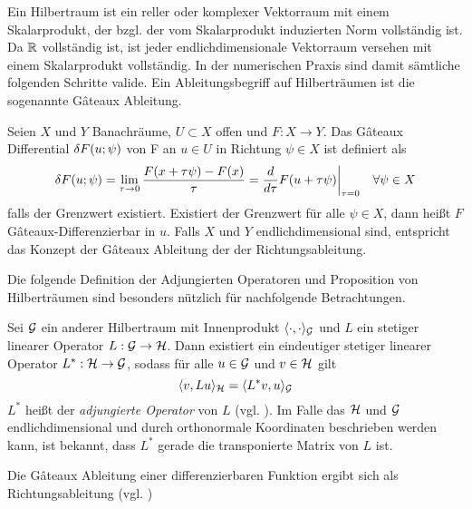 Ein Hilbertraum ist ein reller oder komplexer Vektorraum mit einem Skalarprodukt, der bzgl. der vom Skalarprodukt induzierten Norm vollständig ist. Da $\mathbb{R}$ vollständig ist, ist jeder endlichdimensionale Vektorraum versehen mit einem Skalarprodukt vollständig. In der numerischen Praxis sind damit sämtliche folgenden Schritte valide. 
Ein Ableitungsbegriff auf Hilberträumen ist die sogenannte Gâteaux Ableitung.
\begin{definition}
 Seien $X$ und $Y$ Banachräume, $U \subset X$ offen und $F:X\to Y$. Das Gâteaux Differential $\delta F(u;\psi)$ von F an $u\in U$ in Richtung $\psi\in X$ ist definiert als
 \[
  \delta F(u;\psi) = \lim_{\tau \to 0} \frac{F(x+\tau \psi) - F(x)}{\tau} = \frac{d}{d\tau} F(u+\tau\psi)\biggr\rvert_{\tau = 0}\quad \forall \psi \in X
 \]
 falls der Grenzwert existiert. Existiert der Grenzwert für alle $\psi\in X$, dann heißt $F$ Gâteaux-Differenzierbar in $u$.
 Falls $X$ und $Y$ endlichdimensional sind, entspricht das Konzept der Gâteaux Ableitung der der Richtungsableitung.
\end{definition}
Die folgende Definition der Adjungierten Operatoren und Proposition von Hilberträumen sind besonders nützlich für nachfolgende Betrachtungen.
\begin{definition}
Sei $\mathcal{G}$ ein anderer Hilbertraum mit Innenprodukt $\langle \cdot,\cdot \rangle_{\mathcal{G}}$ und $L$ ein stetiger linearer Operator $L:\mathcal{G}\to \mathcal{H}$. Dann existiert ein eindeutiger stetiger linearer Operator $L^*:\mathcal{H}\to\mathcal{G}$, sodass für alle $u\in \mathcal{G}$ und $v\in \mathcal{H}$ gilt
\begin{equation}
\label{eq:adjointInnerProduct}
\langle v,Lu\rangle_{\mathcal{H}} =  \langle L^*v,u \rangle_{\mathcal{G}}
\end{equation}
$L^*$ heißt der \textit{adjungierte Operator} von $L$ (vgl. \cite[Definition V.5.1]{werner2007funktionalanalysis}). Im Falle das $\mathcal{H}$ und $\mathcal{G}$ endlichdimensional und durch orthonormale Koordinaten beschrieben werden kann, ist bekannt, dass  $L^*$ gerade die transponierte Matrix von $L$ ist.
\end{definition}
Die Gâteaux Ableitung einer differenzierbaren Funktion ergibt sich als Richtungsableitung (vgl. \cite[Example 9.2.4]{debnath2005hilbert})
